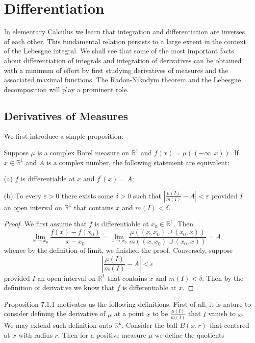 \section{Differentiation}
In elementary Calculus we learn that integration and differentiation are inverses of each other. This fundamental relation persists to a large extent in the context of the Lebesgue integral. We shall see that some of the most important facts about differentiation of integrals and integration of derivatives can be obtained with a minimum of effort by first studying derivatives of measures and the associated maximal functions. The Radon-Nikodym theorem and the Lebesgue decomposition will play a prominent role.
\subsection{Derivatives of Measures}
We first introduce a simple proposition:
\begin{proposition}
Suppose $\mu$ is a complex Borel measure on $\mathbb{R}^1$ and $f(x)=\mu((-\infty,x))$. If $x\in\mathbb{R}^1$ and $A$ is a complex number, the following statement are equivalent:\par
(a) $f$ is differentiable at $x$ and $f^\prime(x)=A$;\par
(b) To every $\varepsilon>0$ there exists some $\delta>0$ such that $\left| \frac{\mu \left( I \right)}{m\left( I \right)}-A \right|<\varepsilon $ provided $I$ an open interval on $\mathbb{R}^1$ that contains $x$ and $m(I)<\delta$.
\end{proposition}
\begin{proof}
We first assume that $f$ is differentiable at $x_0\in\mathbb{R}^1$. Then 
$$
\lim_{x\rightarrow x_0} \frac{f\left( x \right) -f\left( x_0 \right)}{x-x_0}=\lim_{x\rightarrow x_0} \frac{\mu \left( \left( x,x_0 \right) \cup \left( x_0,x \right) \right)}{m\left( \left( x,x_0 \right) \cup \left( x_0,x \right) \right)}=A,
$$
whence by the definition of limit, we finished the proof. Conversely, suppose 
$$
\left| \frac{\mu \left( I \right)}{m\left( I \right)}-A \right|<\varepsilon 
$$
provided $I$ an open interval on $\mathbb{R}^1$ that contains $x$ and $m(I)<\delta$. Then by the definition of derivative we know that $f$ is differentiable at $x$.
\end{proof}
Proposition 7.1.1 motivates us the following definitions. First of all, it is nature to consider defining the derivative of $\mu$ at a point $x$ to be $\frac{\mu(I)}{m(I)}$ that $I$ vanish to $x$. We may extend such definition onto $\mathbb{R}^k$. Consider the ball $B(x,r)$ that centered at $x$ with radius $r$. Then for a positive measure $\mu$ we define the quotients 
